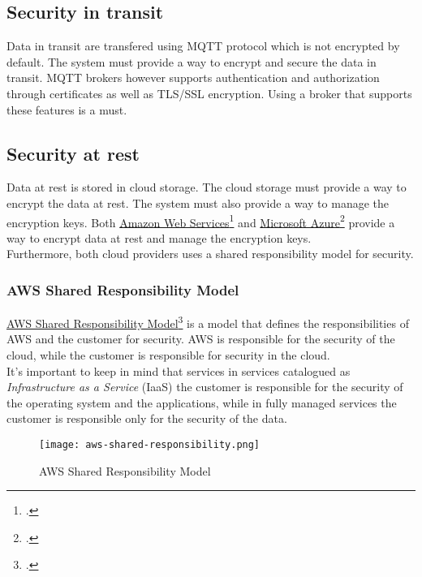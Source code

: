     \subsection{Security in transit}
    Data in transit are transfered using MQTT protocol which is not encrypted by default. The system must provide a way to encrypt and secure the data in transit. MQTT brokers however supports authentication and authorization through certificates as well as TLS/SSL encryption. Using a broker that supports these features is a must.
    
    \subsection{Security at rest}
    Data at rest is stored in cloud storage. The cloud storage must provide a way to encrypt the data at rest. The system must also provide a way to manage the encryption keys. Both \href{https://aws.amazon.com/it/}{Amazon Web Services}\footcite{site:aws} and \href{https://azure.microsoft.com/it-it/}{Microsoft Azure}\footcite{site:azure} provide a way to encrypt data at rest and manage the encryption keys.\\ 
    Furthermore, both cloud providers uses a shared responsibility model for security.
    
    \newpage
    \subsubsection{AWS Shared Responsibility Model}
    \href{https://aws.amazon.com/it/compliance/shared-responsibility-model/}{AWS Shared Responsibility Model}\footcite{site:aws-shared-responsibility-model} is a model that defines the responsibilities of AWS and the customer for security. AWS is responsible for the security of the cloud, while the customer is responsible for security in the cloud.\\
    It's important to keep in mind that services in services catalogued as \textit{Infrastructure as a Service} (IaaS) the customer is responsible for the security of the operating system and the applications, while in fully managed services the customer is responsible only for the security of the data.\\
    \begin{figure}[htbp]
        \centering
        \texttt{[image: aws-shared-responsibility.png]}
        \caption{AWS Shared Responsibility Model}
    \end{figure}

